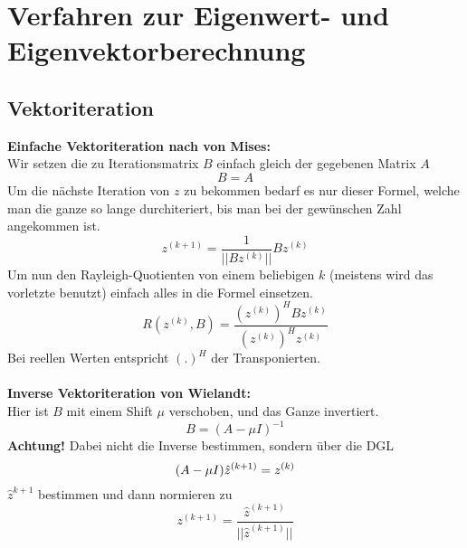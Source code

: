 \documentclass[
ngerman,
accentcolor=9c,%
type=intern,
marginpar=false
]{tudapub}
\begin{document}
    \section{Verfahren zur Eigenwert- und Eigenvektorberechnung}
        \subsection{Vektoriteration}
            \textbf{Einfache Vektoriteration nach von Mises:}\\
            Wir setzen die zu Iterationsmatrix $B$ einfach gleich der gegebenen Matrix $A$
            \begin{equation*}
                B = A
            \end{equation*}
            Um die nächste Iteration von $z$ zu bekommen bedarf es nur dieser Formel, welche man die ganze so lange durchiteriert, bis man bei der gewünschen Zahl angekommen ist.
            \begin{equation*}
                z^{(k+1)} = \dfrac{1}{||Bz^{(k)}||}Bz^{(k)}
            \end{equation*}
            Um nun den Rayleigh-Quotienten von einem beliebigen $k$ (meistens wird das vorletzte benutzt) einfach alles in die Formel einsetzen.
            \begin{equation*}
                R(z^{(k)},B)=\dfrac{(z^{(k)})^H Bz^{(k)}}{(z^{(k)})^Hz^{(k)}}
            \end{equation*}
            Bei reellen Werten entspricht $(.)^H$ der Transponierten.\\
            \\
            \textbf{Inverse Vektoriteration von Wielandt:}\\
            Hier ist $B$ mit einem Shift $\mu$ verschoben, und das Ganze invertiert.
            \begin{equation*}
                B = (A-\mu I)^{-1}
            \end{equation*}
            \textbf{Achtung!} Dabei nicht die Inverse bestimmen, sondern über die DGL
            \begin{equation*}
                (A-\mu I)\hat{z}^{(k+1)} = z^{(k)}\\
            \end{equation*}
            $\hat{z}^{k+1}$ bestimmen und dann normieren zu
            \begin{equation*}
                z^{(k+1)} = \dfrac{\hat{z}^{(k+1)}}{||\hat{z}^{(k+1)}||}
            \end{equation*}
\end{document}
